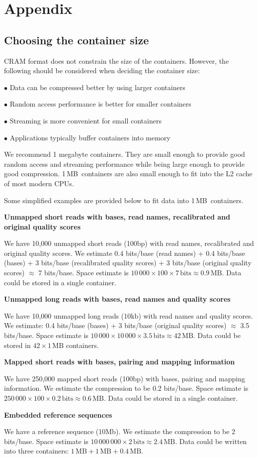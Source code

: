 \documentclass[a4paper]{article}
\newcommand\bits{\,\mbox{bits}}
\newcommand\MB{\,\mbox{MB}}
\begin{document}
\section{\textbf{Appendix}}
\subsection{\textbf{Choosing the container size}}

CRAM format does not constrain the size of the containers. However, the following 
should be considered when deciding the container size:

$\bullet$ Data can be compressed better by using larger containers

$\bullet$ Random access performance is better for smaller containers 

$\bullet$ Streaming is more convenient for small containers

$\bullet$ Applications typically buffer containers into memory

We recommend 1 megabyte containers. They are small enough to provide good random access
and streaming performance while being large enough to provide good compression. 
1\MB\ containers are also small enough to fit into the L2 cache of most modern CPUs.

Some simplified examples are provided below to fit data into 1\MB\ containers.

\textbf{Unmapped short reads with bases, read names, recalibrated and original 
quality scores}

We have 10,000 unmapped short reads (100bp) with read names, recalibrated and original 
quality scores. We estimate 0.4 bits/base (read names) + 0.4 bits/base (bases) 
+ 3 bits/base (recalibrated quality scores) + 3 bits/base (original quality scores) 
$\approx$ 7 bits/base. Space estimate is $10\,000 \times 100 \times 7 \bits
\approx 0.9 \MB$. Data could be stored in a single container.

\textbf{Unmapped long reads with bases, read names and quality scores}

We have 10,000 unmapped long reads (10kb) with read names and quality scores. We 
estimate: 0.4 bits/base (bases) + 3 bits/base (original quality scores) $\approx$
3.5 bits/base. Space estimate is $10\,000 \times 10\,000 \times 3.5 \bits
\approx 42 \MB$. Data could be stored in $42 \times 1\MB$ containers.

\textbf{Mapped short reads with bases, pairing and mapping information}

We have 250,000 mapped short reads (100bp) with bases, pairing and mapping information. 
We estimate the compression to be 0.2 bits/base. Space estimate is $250\,000 \times 100
\times 0.2 \bits \approx 0.6 \MB$. Data could be stored in a single
container.

\textbf{Embedded reference sequences}

We have a reference sequence (10Mb). We estimate the compression to be 2 bits/base. 
Space estimate is $10\,000\,000 \times 2 \bits \approx 2.4 \MB$. Data
could be written into three containers: $1\MB + 1\MB + 0.4\MB$.

\newpage
\end{document}
